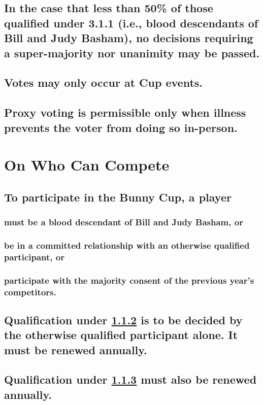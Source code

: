 \documentclass[a4paper]{article}
\begin{document}
\subsection{In the case that less than 50\% of those qualified under 3.1.1 (i.e., blood descendants of Bill and Judy Basham), no decisions requiring a super-majority nor unanimity may be passed.}\label{minforvote}
\subsection{Votes may only occur at Cup events.}
\subsection{Proxy voting is permissible only when illness prevents the voter from doing so in-person.}


\section{On Who Can Compete}
\subsection{To participate in the Bunny Cup, a player}
\subsubsection{must be a blood descendant of Bill and Judy Basham, or}\label{blooddesc}
\subsubsection{be in a committed relationship with an otherwise qualified participant, or}\label{relationship}
\subsubsection{participate with the majority consent of the previous year's competitors.}\label{majorityconsentpart}
\subsection{Qualification under \ref{relationship} is to be decided by the otherwise qualified participant alone. It must be renewed annually.}
\subsection{Qualification under \ref{majorityconsentpart} must also be renewed annually.}
\end{document}
